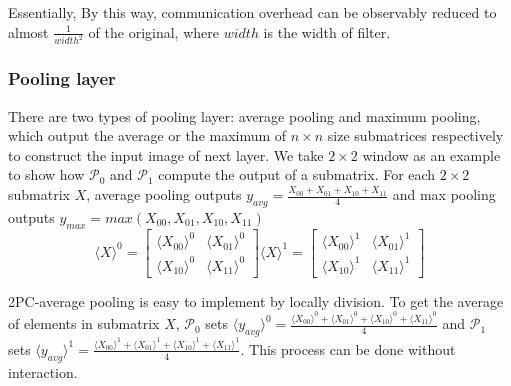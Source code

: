 \documentclass[letterpaper]{article} %
\begin{document}
    Essentially,
    By this way, communication overhead can be observably reduced to almost $ \frac{1}{width^{2}} $ of the original,
    where $width$ is the width of filter.


    \subsubsection{Pooling layer}


    There are two types of pooling layer: average pooling and maximum pooling,
    which output the average or the maximum of $n\times n$ size submatrices respectively
    to construct the input image of next layer.
    We take $2\times 2$ window as an example to show how $\mathcal{P}_{0}$ and $\mathcal{P}_{1}$ compute the output of a submatrix.
    For each $2\times 2$ submatrix $X$, average pooling outputs $y_{avg}=\frac{X_{00}+ X_{01}+ X_{10}+  X_{11}}{4}$
    and max pooling outputs $y_{max}=max(X_{00}, X_{01}, X_{10},  X_{11})$
    $$  \langle X\rangle ^{0}= \begin{bmatrix}
        \langle X_{00}\rangle ^{0}& \langle X_{01}\rangle ^{0} \\
        \langle X_{10}\rangle ^{0}& \langle X_{11}\rangle ^{0}
       \end{bmatrix}\langle X\rangle ^{1}=\begin{bmatrix}
        \langle X_{00}\rangle ^{1}& \langle X_{01}\rangle ^{1} \\
        \langle X_{10}\rangle ^{1}& \langle X_{11}\rangle ^{1}
       \end{bmatrix}$$



    2PC-average pooling is easy to implement by locally division.
    To get the average of elements in submatrix $X$,
    $\mathcal{P}_{0}$ sets $\langle y_{avg}\rangle^{0} =$$ \frac{\langle X_{00}\rangle ^{0}+ \langle X_{01}\rangle ^{0}+
    \langle X_{10}\rangle ^{0}+ \langle X_{11}\rangle ^{0}}{4}$ and
    $\mathcal{P}_{1}$ sets $\langle y_{avg}\rangle^{1} = \frac{\langle X_{00}\rangle ^{1}+ \langle X_{01}\rangle ^{1}+
    \langle X_{10}\rangle ^{1}+ \langle X_{11}\rangle ^{1}}{4}$. This process can be done without interaction.
\end{document}
